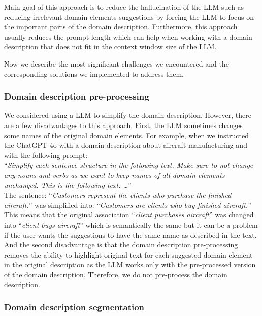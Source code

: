 Main goal of this approach is to reduce the hallucination of the LLM such as reducing irrelevant domain elements suggestions by forcing the LLM to focus on the important parts of the domain description. Furthermore, this approach usually reduces the prompt length which can help when working with a domain description that does not fit in the context window size of the LLM.

Now we describe the most significant challenges we encountered and the corresponding solutions we implemented to address them.


\subsubsection{Domain description pre-processing}

We considered using a LLM to simplify the domain description. However, there are a few disadvantages to this approach. First, the LLM sometimes changes some names of the original domain elements. For example, when we instructed the ChatGPT-4o with a domain description about aircraft manufacturing and with the following prompt: \\

\noindent{}``\textit{Simplify each sentence structure in the following text. Make sure to not change any nouns and verbs as we want to keep names of all domain elements unchanged. This is the following text: \ldots}'' \\

\noindent{}The sentence: ``\textit{Customers represent the clients who purchase the finished aircraft.}'' was simplified into: ``\textit{Customers are clients who buy finished aircraft.}'' This means that the original association ``\textit{client purchases aircraft}'' was changed into ``\textit{client buys aircraft}'' which is semantically the same but it can be a problem if the user wants the suggestions to have the same name as described in the text. And the second disadvantage is that the domain description pre-processing removes the ability to highlight original text for each suggested domain element in the original description as the LLM works only with the pre-processed version of the domain description. Therefore, we do not pre-process the domain description.


\subsubsection{Domain description segmentation}

